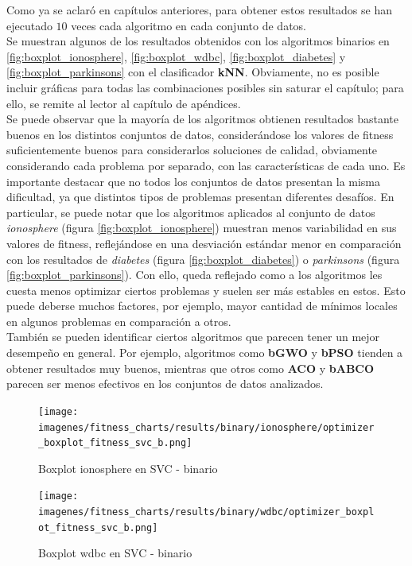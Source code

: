 Como ya se aclaró en capítulos anteriores, para obtener estos resultados se han ejecutado $10$ veces cada algoritmo en cada conjunto de datos.\\[6pt]
Se muestran algunos de los resultados obtenidos con los algoritmos binarios en \ref{fig:boxplot_ionosphere}, \ref{fig:boxplot_wdbc}, \ref{fig:boxplot_diabetes} y \ref{fig:boxplot_parkinsons} con el clasificador \textbf{kNN}. Obviamente, no es posible incluir gráficas para todas las combinaciones posibles sin saturar el capítulo; para ello, se remite al lector al capítulo de apéndices.\\[6pt]
Se puede observar que la mayoría de los algoritmos obtienen resultados bastante buenos en los distintos conjuntos de datos, considerándose los valores de fitness suficientemente buenos para considerarlos soluciones de calidad, obviamente considerando cada problema por separado, con las características de cada uno. Es importante destacar que no todos los conjuntos de datos presentan la misma dificultad, ya que distintos tipos de problemas presentan diferentes desafíos. En particular, se puede notar que los algoritmos aplicados al conjunto de datos \textit{ionosphere} (figura \ref{fig:boxplot_ionosphere}) muestran menos variabilidad en sus valores de fitness, reflejándose en una desviación estándar menor en comparación con los resultados de \textit{diabetes} (figura \ref{fig:boxplot_diabetes}) o \textit{parkinsons} (figura \ref{fig:boxplot_parkinsons}). Con ello, queda reflejado como a los algoritmos les cuesta menos optimizar ciertos problemas y suelen ser más estables en estos. Esto puede deberse muchos factores, por ejemplo, mayor cantidad de mínimos locales en algunos problemas en comparación a otros.\\[6pt]
También se pueden identificar ciertos algoritmos que parecen tener un mejor desempeño en general. Por ejemplo, algoritmos como \textbf{bGWO} y \textbf{bPSO} tienden a obtener resultados muy buenos, mientras que otros como \textbf{ACO} y \textbf{bABCO} parecen ser menos efectivos en los conjuntos de datos analizados.

\begin{figure}[htp]
    \centering
    \texttt{[image: imagenes/fitness\_charts/results/binary/ionosphere/optimizer\_boxplot\_fitness\_svc\_b.png]}
    \caption{Boxplot ionosphere en SVC - binario}
    \label{fig:boxplot_ionospheresvc}
\end{figure}

\begin{figure}[htp]
    \centering
    \texttt{[image: imagenes/fitness\_charts/results/binary/wdbc/optimizer\_boxplot\_fitness\_svc\_b.png]}
    \caption{Boxplot wdbc en SVC - binario}
    \label{fig:boxplot_wdbcsvc}
\end{figure}

